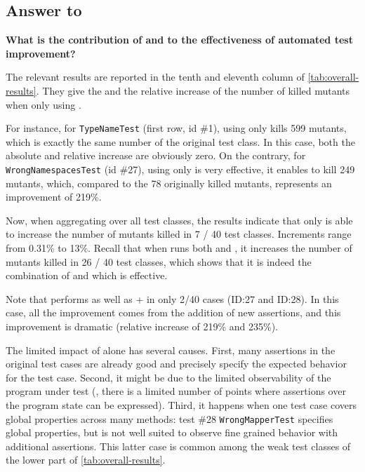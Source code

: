 \subsection{Answer to \rqAmplVersusIAmpl}
\label{subsec:test-improvement:experiment-results:rq4}

\textbf{What is the contribution of \Iampl and \Aampl to the effectiveness of automated test improvement?}

The relevant results are reported in the tenth and eleventh column of \autoref{tab:overall-results}.
They give the \ams and the relative increase of the number of killed mutants when only using \Aampl.

For instance, for \texttt{TypeNameTest} (first row, id \#1), using only \Aampl kills 599 mutants, which is exactly the same number of the original test class. 
In this case, both the absolute and relative increase are obviously zero.
On the contrary, for \texttt{WrongNamespacesTest} (id \#27), using only \Aampl is very effective, it enables \dspot to kill 249 mutants, which, compared to the 78 originally killed mutants, represents an improvement of 219\%. 

Now, when aggregating over all test classes, the results indicate that \Aampl only is able to increase the number of mutants killed in 7 / 40 test classes. 
Increments range from 0.31\% to 13\%. 
Recall that when \dspot runs both \Iampl{} and \Aampl, it increases the number of mutants killed in 26 / 40 test classes, which shows that it is indeed the combination of \Aampl and \Iampl which is effective.

Note that \Aampl performs as well as \Iampl + \Aampl in only 2/40 cases (ID:27 and ID:28). 
In this case, all the improvement comes from the addition of new assertions, and this improvement is dramatic (relative increase of 219\% and 235\%).

The limited impact of \Aampl alone has several causes. 
First, many assertions in the original test cases are already good and precisely specify the expected behavior for the test case.
Second, it might be due to the limited observability of the program under test (\ie, there is a limited number of points where assertions over the program state can be expressed).
Third, it happens when one test case covers global properties across many methods: test \#28 \texttt{WrongMapperTest} specifies global properties, but is not well suited to observe fine grained behavior with additional assertions. 
This latter case is common among the weak test classes of the lower part of \autoref{tab:overall-results}.


